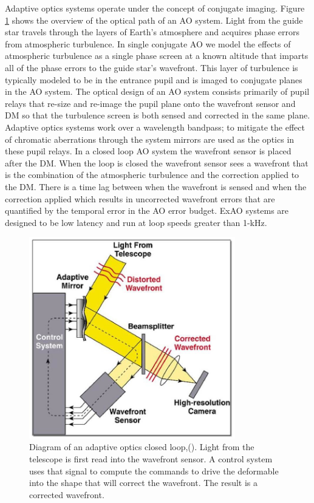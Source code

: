 Adaptive optics systems operate under the concept of conjugate imaging. Figure \ref{fig:AOdiagram} shows the overview of the optical path of an AO system. Light from the guide star travels through the layers of Earth's atmosphere and acquires phase errors from atmospheric turbulence. In single conjugate AO we model the effects of atmospheric turbulence as a single phase screen at a known altitude that imparts all of the phase errors to the guide star's wavefront. This layer of turbulence is typically modeled to be in the entrance pupil and is imaged to conjugate planes in the AO system. The optical design of an AO system consists primarily of pupil relays that re-size and re-image the pupil plane onto the wavefront sensor and DM so that the turbulence screen is both sensed and corrected in the same plane. Adaptive optics systems work over a wavelength bandpass; to mitigate the effect of chromatic aberrations through the system mirrors are used as the optics in these pupil relays. In a closed loop AO system the wavefront sensor is placed after the DM. When the loop is closed the wavefront sensor sees a wavefront that is the combination of the atmospheric turbulence and the correction applied to the DM. There is a time lag between when the wavefront is sensed and when the correction applied which results in uncorrected wavefront errors that are quantified by the temporal error in the AO error budget. ExAO systems are designed to be low latency and run at loop speeds greater than 1-kHz.




\begin{figure}
    \centering
    \includegraphics[width=0.8\textwidth]{Chapter Materials/Chapter Two Materials/Adaptive-Optics-System.png}
    \caption{Diagram of an adaptive optics closed loop,(\cite{suarez2017approach}). Light from the telescope is first read into the wavefront sensor. A control system uses that signal to compute the commands to drive the deformable into the shape that will correct the wavefront. The result is a corrected wavefront.}
    \label{fig:AOdiagram}
\end{figure}

